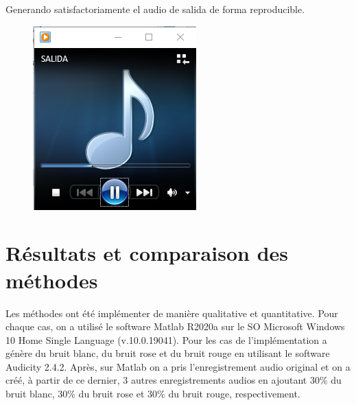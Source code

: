 \documentclass[conference,onecolumn]{IEEEtran}
\begin{document}
Generando satisfactoriamente el audio de salida de forma reproducible.

 \begin{figure}[H]
 \centering
    \includegraphics[scale=0.5]{VM12.png}
\end{figure}

\newpage
\section{Résultats et comparaison des méthodes}
Les méthodes ont été implémenter de manière qualitative et quantitative. Pour chaque cas, on a utilisé le software Matlab R2020a sur le SO Microsoft Windows 10 Home Single Language (v.10.0.19041). Pour les cas de l’implémentation a génère du bruit blanc, du bruit rose et du bruit rouge en utilisant le software Audicity 2.4.2. Après, sur Matlab on a pris l’enregistrement audio original et on a créé, à partir de ce dernier, 3 autres enregistrements audios en ajoutant 30\% du bruit blanc, 30\% du bruit rose et 30\% du bruit rouge, respectivement.
\end{document}
